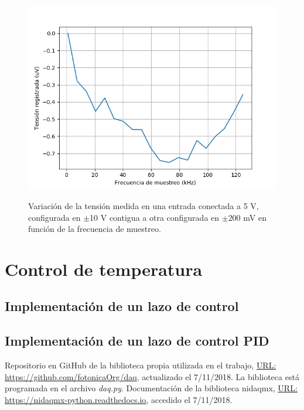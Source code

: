 \documentclass[a4paper,11pt]{article}
\begin{document}
\begin{figure}[h!]
\centering
\includegraphics[width=\columnwidth]{figs/settling5V.png}
\label{fig:settling2}
\caption{Variación de la tensión medida en una entrada conectada a 5 V, configurada en $\pm$10 V contigua a otra configurada en $\pm$200 mV en función de la frecuencia de muestreo.}
\end{figure}


\section{Control de temperatura}
\label{sec:control_temperatura}

\subsection{Implementación de un lazo de control}

\subsection{Implementación de un lazo de control PID}




\clearpage

\begin{thebibliography}{99}

	 Repositorio en GitHub de la biblioteca propia utilizada en el trabajo, \href{https://github.com/fotonicaOrg/daq}{URL: https://github.com/fotonicaOrg/daq}, actualizado el 7/11/2018. La biblioteca está programada en el archivo \emph{daq.py}.
	 Documentación de la biblioteca nidaqmx, \href{https://nidaqmx-python.readthedocs.io}{URL: https://nidaqmx-python.readthedocs.io}, accedido el 7/11/2018.


\end{thebibliography}
\end{document}
